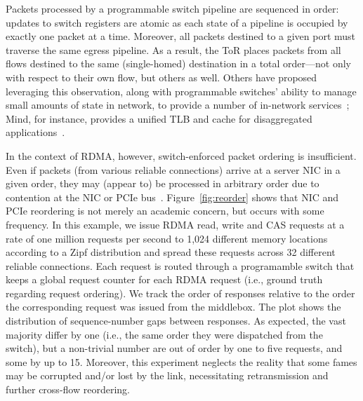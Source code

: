 Packets processed by a programmable switch pipeline are sequenced in
order: updates to switch registers are atomic as each state of a
pipeline is occupied by exactly one packet at a time.  Moreover, all
packets destined to a given port must traverse the same egress
pipeline.  As a result, the ToR places packets from all flows destined
to the same (single-homed) destination in a total order---not only with
respect to their own flow, but others as well.  Others have proposed
leveraging this observation, along with programmable switches' ability
to manage small amounts of state in network, to provide a number of
in-network services~\cite{when-computer}; Mind, for instance, provides
a unified TLB and cache for disaggregated applications~\cite{mind}.


In the context of RDMA, however, switch-enforced packet ordering is
insufficient.  Even if packets (from various reliable connections)
arrive at a server NIC in a given order, they may (appear to) be
processed in arbitrary order due to contention at the NIC or PCIe
bus~\cite{understanding-pcie}. Figure~\ref{fig:reorder} shows that NIC
and PCIe reordering is not merely an academic concern, but occurs with
some frequency.  In this example, we issue RDMA read, write and CAS
requests at a rate of one million requests per second to 1,024
different memory locations according to a Zipf distribution and spread
these requests across 32 different reliable connections. Each request is routed
through a programamble switch that keeps a global request counter for
each RDMA request (i.e., ground truth regarding request ordering). We
track the order of responses relative to the order the corresponding
request was issued from the middlebox. The plot shows the distribution
of sequence-number gaps between responses. As expected, the vast
majority differ by one (i.e., the same order they were dispatched from
the switch), but a non-trivial number are out of order by one to five
requests, and some by up to 15.  Moreover, this experiment neglects
the reality that some fames may be corrupted and/or lost by the link,
necessitating retransmission and further cross-flow reordering.






